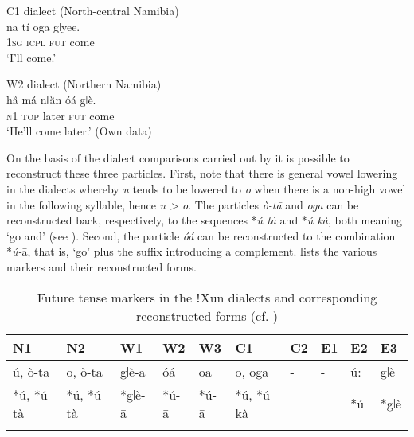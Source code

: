 \documentclass[output=paper]{langsci/langscibook}
\begin{document}
\ea%
    \label{ex:heine:6} 
C1 dialect (North-central Namibia)\\
\gll    na     tí oga    gǀyee.\\
   \textsc{1sg}   \textsc{icpl}   \textsc{fut}     come\\
\glt    ‘I’ll come.’ \citep[20]{Vedder1910-1911}
\z



\ea%
    \label{ex:heine:7} 
W2 dialect (Northern Namibia) \\
\gll   hȁ      má    nǁȁn   óá    gǀè.\\
  \textsc{n1}     \textsc{top}   later   \textsc{fut}  come\\
\glt   ‘He’ll come later.’ (Own data)
\z



On the basis of the dialect comparisons carried out by \citet{HeineKönigForthc} it is possible to reconstruct these three particles. First, note that there is general vowel lowering in the dialects whereby \textit{u} tends to be lowered to \textit{o} when there is a non-high vowel in the following syllable, hence \textit{u > o}. The particles \textit{ò-tā} and \textit{oga} can be reconstructed back, respectively, to the sequences *{\textit{ú tà}} and *{\textit{ú kà}}, both meaning ‘go and' (see ).
Second, the particle \textit{óá} can be reconstructed to the combination *{\textit{ú-}{ā}}, that is, ‘go' plus the  suffix introducing a complement.  lists the various  markers and their reconstructed forms.



\begin{table}


\begin{tabularx}{\textwidth}{XXXXXXXXXX}
\lsptoprule

N1& N2& W1& W2& W3& C1& C2& E1& E2& E3\\
\midrule
 ú, ò-tā& o, ò-tā& g{ǀ}è-ā& óá& ōā& o, oga& -& -& ú:& g{ǀ}è\\
 *ú, *ú tà& *ú, *ú tà& *g{ǀ}è-ā& *ú-ā& *ú-ā& *ú, *ú kà&  &  & *ú& *g{ǀ}è\\
\lspbottomrule
\end{tabularx}

\caption{Future tense markers in the ⁠ǃ⁠Xun dialects and corresponding reconstructed forms (cf. \citealt{HeineKönigForthc})}
\label{tab:heine:3}
\end{table}
\end{document}
